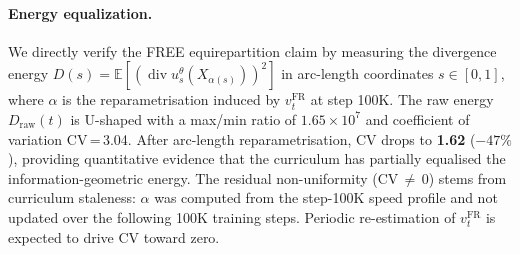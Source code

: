 \paragraph{Energy equalization.}
We directly verify the FREE equirepartition claim by measuring the divergence energy $D(s) = \mathbb{E}[(\operatorname{div} u_s^\theta(X_{\alpha(s)}))^2]$ in arc-length coordinates $s \in [0,1]$, where $\alpha$ is the reparametrisation induced by $v_t^{\mathrm{FR}}$ at step 100K.
The raw energy $D_{\mathrm{raw}}(t)$ is U-shaped with a max/min ratio of $1.65 \times 10^7$ and coefficient of variation CV\,=\,3.04.
After arc-length reparametrisation, CV drops to \textbf{1.62} ($-47\%$), providing quantitative evidence that the curriculum has partially equalised the information-geometric energy.
The residual non-uniformity (CV\,$\neq$\,0) stems from curriculum staleness: $\alpha$ was computed from the step-100K speed profile and not updated over the following 100K training steps.
Periodic re-estimation of $v_t^{\mathrm{FR}}$ is expected to drive CV toward zero.

